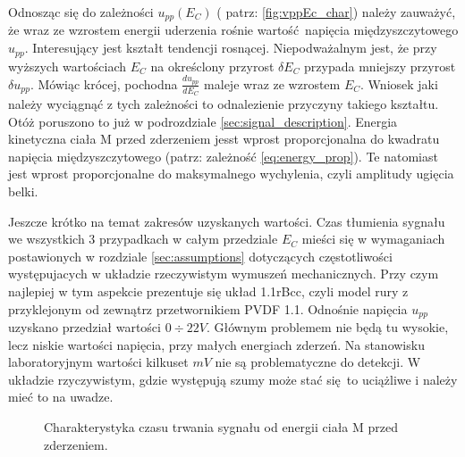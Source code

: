 \indent Odnosząc się do zależności $u_{pp}(E_C)$ ( patrz: \ref{fig:vppEc_char})
należy zauważyć, że wraz ze wzrostem energii uderzenia rośnie wartość napięcia
międzyszczytowego $u_{pp}$. Interesujący jest kształt tendencji rosnącej.
Niepodważalnym jest, że przy wyższych wartościach $E_C$ na okreśclony przyrost
$\delta E_C$ przypada mniejszy przyrost $\delta u_{pp}$. Mówiąc krócej, pochodna
$\frac{ du_{pp}}{dE_C}$ maleje wraz ze wzrostem $E_C$. Wniosek jaki należy wyciągnąć
z tych zależności to odnalezienie przyczyny takiego kształtu. Otóż poruszono to już w
podrozdziale \ref{sec:signal_description}. Energia kinetyczna ciała M przed 
zderzeniem jesst wprost proporcjonalna do kwadratu napięcia międzyszczytowego
(patrz: zależność \ref{eq:energy_prop}). Te natomiast jest wprost proporcjonalne do
maksymalnego wychylenia, czyli amplitudy ugięcia belki.

\indent Jeszcze krótko na temat zakresów uzyskanych wartości. Czas tłumienia sygnału
we wszystkich 3 przypadkach w całym przedziale $E_C$ mieści się w wymaganiach postawionych
w rozdziale \ref{sec:assumptions} dotyczących częstotliwości występujacych w układzie
rzeczywistym wymuszeń mechanicznych. Przy czym najlepiej w tym aspekcie prezentuje się
układ 1.1rBcc, czyli model rury z przyklejonym od zewnątrz przetwornikiem PVDF 1.1.
Odnośnie napięcia $u_{pp}$ uzyskano przedział wartości $0 \div 22 V$. Głównym problemem
nie będą tu wysokie, lecz niskie wartości napięcia, przy małych energiach zderzeń. 
Na stanowisku laboratoryjnym wartości kilkuset $mV$ nie są problematyczne do detekcji.
W układzie rzyczywistym, gdzie występują szumy może stać się to uciążliwe i należy mieć
to na uwadze.

\pgfplotsset{width=\linewidth,compat=1.3}

\begin{figure}[htbp]
\centering
\caption{Charakterystyka czasu trwania sygnału od energii ciała M przed zderzeniem.}
\label{fig:tdEc_char}
\end{figure}


